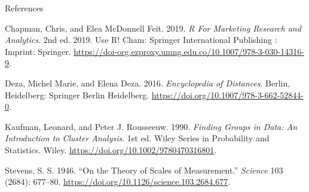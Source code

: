 \documentclass[
  ignorenonframetext,
]{beamer}
\newlength{\cslhangindent}
\newenvironment{CSLReferences}[2] %
 {\begin{list}{}{%
  \setlength{\itemindent}{0pt}
  \setlength{\leftmargin}{0pt}
  \setlength{\parsep}{0pt}
  \ifodd #1
   \setlength{\leftmargin}{\cslhangindent}
   \setlength{\itemindent}{-1\cslhangindent}
  \fi
  \setlength{\itemsep}{#2\baselineskip}}}
 {\end{list}}
\begin{document}
\begin{frame}[allowframebreaks]{References}
\label{refs}
\begin{CSLReferences}{1}{0}
Chapman, Chris, and Elea McDonnell Feit. 2019. \emph{R {For} {Marketing}
{Research} and {Analytics}}. 2nd ed. 2019. Use {R}! Cham: Springer
International Publishing : Imprint: Springer.
\url{https://doi-org.ezproxy.umng.edu.co/10.1007/978-3-030-14316-9}.

Deza, Michel Marie, and Elena Deza. 2016. \emph{Encyclopedia of
{Distances}}. Berlin, Heidelberg: Springer Berlin Heidelberg.
\url{https://doi.org/10.1007/978-3-662-52844-0}.

Kaufman, Leonard, and Peter J. Rousseeuw. 1990. \emph{Finding {Groups}
in {Data}: {An} {Introduction} to {Cluster} {Analysis}}. 1st ed. Wiley
{Series} in {Probability} and {Statistics}. Wiley.
\url{https://doi.org/10.1002/9780470316801}.

Stevens, S. S. 1946. {``On the {Theory} of {Scales} of {Measurement}.''}
\emph{Science} 103 (2684): 677--80.
\url{https://doi.org/10.1126/science.103.2684.677}.

\end{CSLReferences}
\end{frame}
\end{document}
